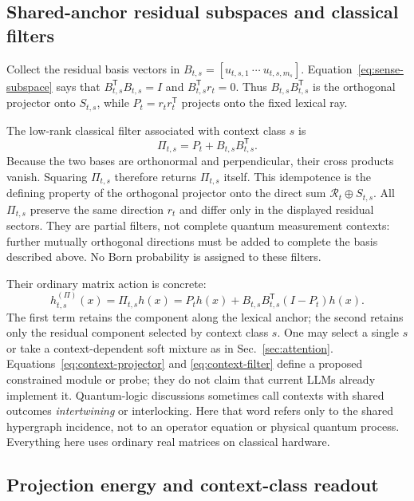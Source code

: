 \documentclass[
  aps,
  reprint,
  superscriptaddress,
  floatfix,
  nofootinbib,
  longbibliography
]{revtex4-2}
\newcommand{\T}{^{\mathsf{T}}}
\begin{document}
\subsection{Shared-anchor residual subspaces and classical filters}
\label{sec:classical-filters}

Collect the residual basis vectors in
$B_{t,s}=[u_{t,s,1}\ \cdots\ u_{t,s,m_s}]$.  Equation~\eqref{eq:sense-subspace}
says that $B_{t,s}\T B_{t,s}=I$ and $B_{t,s}\T r_t=0$.  Thus
$B_{t,s}B_{t,s}\T$ is the orthogonal projector onto $S_{t,s}$, while
$P_t=r_t r_t\T$ projects onto the fixed lexical ray.

The low-rank classical filter associated with context class $s$ is
%
\begin{equation}
\label{eq:context-projector}
\Pi_{t,s}=P_t+B_{t,s}B_{t,s}\T .
\end{equation}
Because the two bases are orthonormal and perpendicular, their cross products
vanish.  Squaring $\Pi_{t,s}$ therefore returns $\Pi_{t,s}$ itself.  This
idempotence is the defining property of the orthogonal projector onto the
direct sum $\mathcal R_t\oplus S_{t,s}$.
All $\Pi_{t,s}$ preserve the same direction $r_t$ and differ only in the
displayed residual sectors.  They are partial filters, not complete quantum
measurement contexts: further mutually orthogonal directions must be added to
complete the basis described above.  No Born probability is assigned to these
filters.

Their ordinary matrix action is concrete:
%
\begin{equation}
\label{eq:context-filter}
h_{t,s}^{(\Pi)}(x)
=\Pi_{t,s}h(x)
=P_t h(x)+B_{t,s}B_{t,s}\T(I-P_t)h(x).
\end{equation}
%
The first term retains the component along the lexical anchor; the second
retains only the residual component selected by context class $s$.  One may select a
single $s$ or take a context-dependent soft mixture as in
Sec.~\ref{sec:attention}.  Equations~\eqref{eq:context-projector} and
\eqref{eq:context-filter} define a proposed constrained module or probe; they
do not claim that current LLMs already implement it.  Quantum-logic discussions
sometimes call contexts with shared outcomes \emph{intertwining} or
interlocking.  Here that word refers only to the shared hypergraph incidence,
not to an operator equation or physical quantum process.  Everything here uses
ordinary real matrices on classical hardware.

\subsection{Projection energy and context-class readout}
\label{sec:gated}
\end{document}
